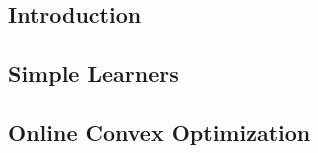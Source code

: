 

\subsection{Introduction}


\subsection{Simple Learners}





\subsection{Online Convex Optimization}

